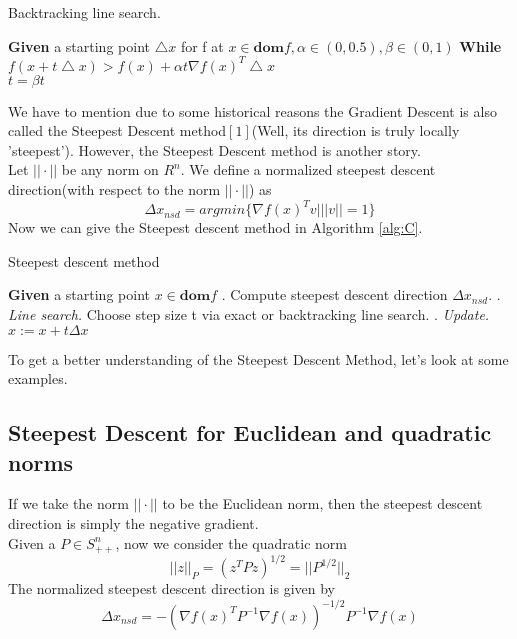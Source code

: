 \documentclass{article}
\begin{document}
\begin{algorithm}\caption{\label{alg:B}Backtracking line search.}
\begin{algorithmic}
\STATE \textbf{Given} a starting point $\bigtriangleup x$ for f at $x \in \textbf{dom} f, \alpha \in (0,0.5), \beta \in (0,1)$
\STATE \textbf{While} $f(x + t\bigtriangleup x) > f(x) + \alpha t \nabla f(x)^T \bigtriangleup x$ \\
{$t = \beta t$}
\end{algorithmic}
\end{algorithm}
We have to mention due to some historical reasons the Gradient Descent is also called the Steepest Descent method$[1]$(Well, its direction is truly locally 'steepest'). However, the Steepest Descent method is another story.\\
Let $||\cdot||$ be any norm on $R^n$. We define a normalized steepest descent direction(with respect to the norm $||\cdot||$) as
\begin{displaymath}
\Delta x _{nsd} = argmin\{ \nabla f(x)^Tv| ||v|| = 1\}
\end{displaymath}
Now we can give the Steepest descent method in Algorithm \ref{alg:C}.
\begin{algorithm}\caption{\label{alg:C}Steepest descent method}
\begin{algorithmic}
\STATE \textbf{Given} a starting point $x \in \textbf{dom} f$
\REPEAT
{}. Compute steepest descent direction $\Delta x _{nsd}$.
. \textit{Line search.} Choose step size t via exact or backtracking line search.
. \textit{Update.} $x:=x+t\Delta x$
\end{algorithmic}
\end{algorithm}
To get a better understanding of the Steepest Descent Method, let's look at some examples.
\subsection{Steepest Descent for Euclidean and quadratic norms}
If  we take the norm $||\cdot||$ to be the Euclidean norm, then the steepest descent direction is simply the negative gradient.\\
Given a $P \in S^n_{++}$, now we consider the quadratic norm
\begin{displaymath}
||z||_P = (z^TPz)^{1/2} = ||P^{1/2}||_2
\end{displaymath}
The normalized steepest descent direction is given by 
\begin{displaymath}
\Delta x_{nsd} = -(\nabla f(x) ^ T P ^{-1} \nabla f(x))^{-1/2} P ^{-1} \nabla f(x)
\end{displaymath}
\end{document}
